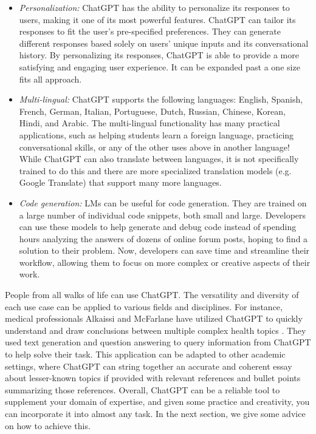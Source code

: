\documentclass[12pt]{article}
\begin{document}
\begin{itemize}
    \item \textit{Personalization:} ChatGPT has the ability to personalize its responses to users, making it one of its most powerful features. ChatGPT can tailor its responses to fit the user's pre-specified preferences. They can generate different responses based solely on users' unique inputs and its conversational history. By personalizing its responses, ChatGPT is able to provide a more satisfying and engaging user experience. It can be expanded past a one size fits all approach.
    \item \textit{Multi-lingual:} ChatGPT supports the following languages: English, Spanish, French, German, Italian, Portuguese, Dutch, Russian, Chinese, Korean, Hindi, and Arabic. The multi-lingual functionality has many practical applications, such as helping students learn a foreign language, practicing conversational skills, or any of the other uses above in another language! While ChatGPT can also translate between languages, it is not specifically trained to do this and there are more specialized translation models (e.g. Google Translate) that support many more languages. 
    \item \textit{Code generation:} LMs can be useful for code generation. They are trained on a large number of individual code snippets, both small and large. Developers can use these models to help generate and debug code instead of spending hours analyzing the answers of dozens of online forum posts, hoping to find a solution to their problem. Now, developers can save time and streamline their workflow, allowing them to focus on more complex or creative aspects of their work.
\end{itemize}

People from all walks of life can use ChatGPT. The versatility and diversity of each use case can be applied to various fields and disciplines. For instance, medical professionals Alkaissi and McFarlane have utilized ChatGPT to quickly understand and draw conclusions between multiple complex health topics \cite{alkaissi_mcfarlane_2023}. They used text generation and question answering to query information from ChatGPT to help solve their task. This application can be adapted to other academic settings, where ChatGPT can string together an accurate and coherent essay about lesser-known topics if provided with relevant references and bullet points summarizing those references. Overall, ChatGPT can be a reliable tool to supplement your domain of expertise, and given some practice and creativity, you can incorporate it into almost any task. In the next section, we give some advice on how to achieve this.
\end{document}
